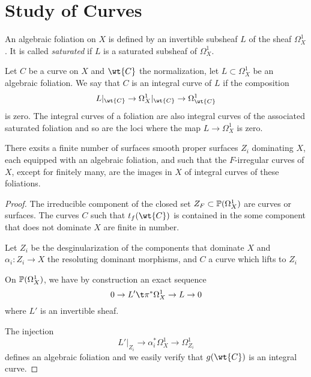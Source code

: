 \documentclass[12pt]{article}
\begin{document}
\section{Study of Curves}

\begin{defn}
An algebraic foliation on $X$ is defined by an invertible subsheaf $L$ of the sheaf $\Omega_X^1$. It is called \textit{saturated} if $L$ is a saturated subsheaf of $\Omega_X^1$.
\end{defn}

\begin{defn}
Let $C$ be a curve on $X$ and $\wt{C}$ the normalization, let $L \subset \Omega_X^1$ be an algebraic foliation. We say that $C$ is an integral curve of $L$ if the composition
\[ L|_{\wt{C}} \to \Omega^1_X |_{\wt{C}} \to \Omega^1_{\wt{C}} \]
is zero. The integral curves of a foliation are also integral curves of the associated saturated foliation and so are the loci where the map $L \to \Omega_X^1$ is zero. 
\end{defn}

\begin{prop}
There exsits a finite number of surfaces smooth proper surfaces $Z_i$ dominating $X$, each equipped with an algebraic foliation, and such that the $F$-irregular curves of $X$, except for finitely many, are the images in $X$ of integral curves of these foliations.
\end{prop}

\begin{proof}
The irreducible component of the closed set $Z_F \subset \P(\Omega_X^1)$ are curves or surfaces. The curves $C$ such that $t_f(\wt{C})$ is contained in the some component that does not dominate $X$ are finite in number.
\par 
Let $Z_i$ be the desginularization of the components that dominate $X$ and $\alpha_i : Z_i \to X$ the resoluting dominant morphisms, and $C$ a curve which lifts to $Z_i$
\begin{center}
\end{center}
On $\P(\Omega_X^1)$, we have by construction an exact sequence
\[ 0 \to L' \t \pi^* \Omega_X^1 \to L \to 0 \]
where $L'$ is an invertible sheaf. 
\par 
The injection
\[ L'|_{Z_i} \to \alpha_i^* \Omega_X^1 \to \Omega^1_{Z_i} \]
defines an algebraic foliation and we easily verify that $g(\wt{C})$ is an integral curve.
\end{proof}
\end{document}
